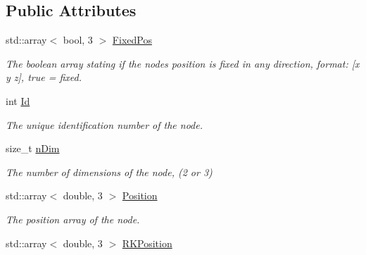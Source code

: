 \subsection*{Public Attributes}
\begin{DoxyCompactItemize}
\item 
\hypertarget{classNode_a8f3a763935fb67e34784d060c0ea76f8}{}std\+::array$<$ bool, 3 $>$ \hyperlink{classNode_a8f3a763935fb67e34784d060c0ea76f8}{Fixed\+Pos}\label{classNode_a8f3a763935fb67e34784d060c0ea76f8}

\begin{DoxyCompactList}\small\item\em The boolean array stating if the node\textquotesingle{}s position is fixed in any direction, format\+: \mbox{[}x y z\mbox{]}, true = fixed. \end{DoxyCompactList}\item 
\hypertarget{classNode_a1bd379569cc1a8b96432e61971aed4d9}{}int \hyperlink{classNode_a1bd379569cc1a8b96432e61971aed4d9}{Id}\label{classNode_a1bd379569cc1a8b96432e61971aed4d9}

\begin{DoxyCompactList}\small\item\em The unique identification number of the node. \end{DoxyCompactList}\item 
\hypertarget{classNode_aaa21f137c35d767ff0a119ef5e058194}{}size\+\_\+t \hyperlink{classNode_aaa21f137c35d767ff0a119ef5e058194}{n\+Dim}\label{classNode_aaa21f137c35d767ff0a119ef5e058194}

\begin{DoxyCompactList}\small\item\em The number of dimensions of the node, (2 or 3) \end{DoxyCompactList}\item 
\hypertarget{classNode_a70e54350ca21406946b8e1b34360dbae}{}std\+::array$<$ double, 3 $>$ \hyperlink{classNode_a70e54350ca21406946b8e1b34360dbae}{Position}\label{classNode_a70e54350ca21406946b8e1b34360dbae}

\begin{DoxyCompactList}\small\item\em The position array of the node. \end{DoxyCompactList}\item 
\hypertarget{classNode_a34061bba1f26ce526f8cb17ed2bab561}{}std\+::array$<$ double, 3 $>$ \hyperlink{classNode_a34061bba1f26ce526f8cb17ed2bab561}{R\+K\+Position}\label{classNode_a34061bba1f26ce526f8cb17ed2bab561}


\end{DoxyCompactItemize}
